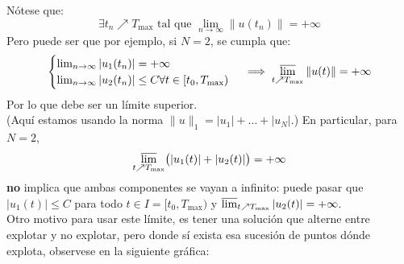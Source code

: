 \begin{observación}
    Nótese que:
    \[
        \exists t_n \nearrow T_{\text{max}} \text{ tal que }
        \lim_{n \to \infty} \| u(t_n) \| = +\infty
    \]
    Pero puede ser que por ejemplo, si $N = 2$, se cumpla que:
    \[
        \begin{cases}
            \lim_{n \to \infty} | u_1(t_n) | = +\infty \\
            \lim_{n \to \infty} | u_2(t_n) | \leq C
            \forall t \in [t_0, T_{\text{max}})
        \end{cases}
        \implies
        \varlimsup_{t \nearrow T_{\text{max}}} \| u(t) \| = +\infty
    \]
    Por lo que debe ser un límite superior.\\

    (Aquí estamos usando la norma $\|u\|_1 = |u_1| + \dots + |u_N|$.) En particular, para $N = 2$,
    \[
        \varlimsup_{t \nearrow T_{\text{max}}} \bigl( |u_1(t)| + |u_2(t)| \bigr) = +\infty
    \]
    \textbf{no} implica que ambas componentes se vayan a infinito: puede pasar que $|u_1(t)| \leq C$ para todo $t \in I = [t_0, T_{\text{max}})$ y $\varlimsup_{t \nearrow T_{\text{max}}} |u_2(t)| = +\infty$.\\

    Otro motivo para usar este límite, es tener una solución que alterne entre explotar y no explotar, pero donde sí exista esa sucesión de puntos dónde explota, observese en la siguiente gráfica:

    \begin{center}
\end{center}
\end{observación}
